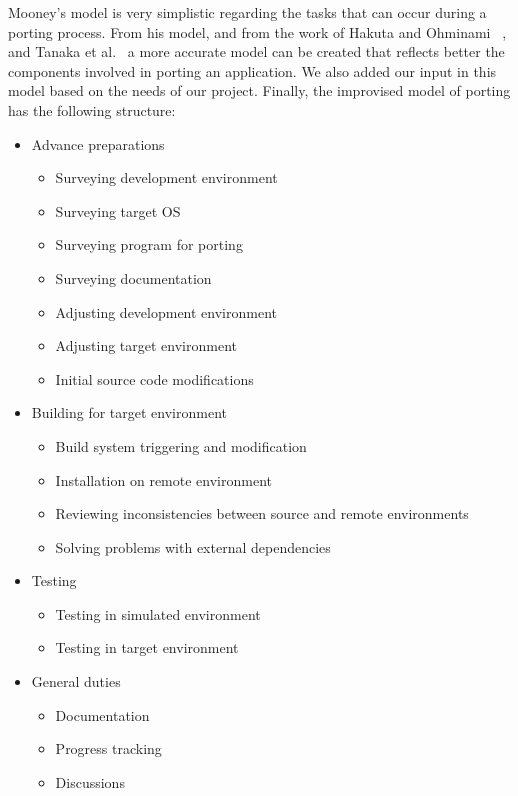 Mooney's model is very simplistic regarding the tasks that can occur during
a porting process. From his model, and from the work of Hakuta and Ohminami~
\cite{hakuta}, and Tanaka et al.~\cite{tanaka} a more accurate model can be created that
reflects better the components involved in porting an application. We also added
our input in this model based on the needs of our project. Finally, the improvised model of porting has the following structure:
\begin{itemize}
    \item Advance preparations
        \begin{itemize}
            \item Surveying development environment
            \item Surveying target OS
            \item Surveying program for porting
            \item Surveying documentation
            \item Adjusting development environment
            \item Adjusting target environment
            \item Initial source code modifications
        \end{itemize}
    \item Building for target environment
        \begin{itemize}
            \item Build system triggering and modification
            \item Installation on remote environment
            \item Reviewing inconsistencies between source and remote
            environments
            \item Solving problems with external dependencies
        \end{itemize}
    \item Testing
        \begin{itemize}
            \item Testing in simulated environment
            \item Testing in target environment
        \end{itemize}
    \item General duties
        \begin{itemize}
            \item Documentation
            \item Progress tracking
            \item Discussions
        \end{itemize}
\end{itemize}

